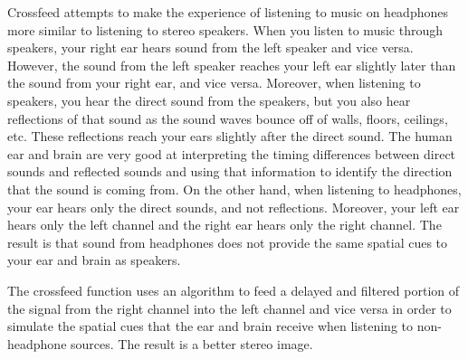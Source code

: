 \begin{itemize}
{    Crossfeed attempts to make the experience of listening to music on headphones more similar to listening to stereo speakers. When you listen to music through speakers, your right ear hears sound from the left speaker and vice versa. However, the sound from the left speaker reaches your left ear slightly later than the sound from your right ear, and vice versa. Moreover, when listening to speakers, you hear the direct sound from the speakers, but you also hear reflections of that sound as the sound waves bounce off of walls, floors, ceilings, etc. These reflections reach your ears slightly after the direct sound. The human ear and brain are very good at interpreting the timing differences between direct sounds and reflected sounds and using that information to identify the direction that the sound is coming from.  On the other hand, when listening to headphones, your ear hears only the direct sounds, and not reflections. Moreover, your left ear hears only the left channel and the right ear hears only the right channel. The result is that sound from headphones does not provide the same spatial cues to your ear and brain as speakers.
    
    The crossfeed function uses an algorithm to feed a delayed and filtered portion of the signal from the right channel into the left channel and vice versa in order to simulate the spatial cues that the ear and brain receive when listening to non-headphone sources. The result is a better stereo image.
  }

\end{itemize}
